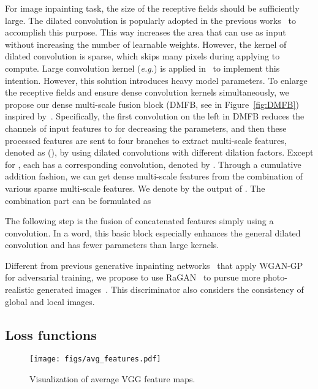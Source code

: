 \documentclass[journal]{IEEEtran}
\newcommand{\eg}{\emph{e.g.}}
\begin{document}
For image inpainting task, the size of the receptive fields should be sufficiently large. The dilated convolution is popularly adopted in the previous works~\cite{globally-and-locally,contextual-attention} to accomplish this purpose. This way increases the area that can use as input without increasing the number of learnable weights. However, the kernel of dilated convolution is sparse, which skips many pixels during applying to compute. Large convolution kernel (\eg ) is applied in~\cite{GMCNN} to implement this intention. However, this solution introduces heavy model parameters. To enlarge the receptive fields and ensure dense convolution kernels simultaneously, we propose our dense multi-scale fusion block (DMFB, see in Figure~\ref{fig:DMFB}) inspired by~\cite{Hui-PPON-2019}. Specifically, the first convolution on the left in DMFB reduces the channels of input features to  for decreasing the parameters, and then these processed features are sent to four branches to extract multi-scale features, denoted as  (), by using dilated convolutions with different dilation factors. Except for , each  has a corresponding  convolution, denoted by . Through a cumulative addition fashion, we can get dense multi-scale features from the combination of various sparse multi-scale features. We denote by  the output of . The combination part can be formulated as

The following step is the fusion of concatenated features simply using a  convolution. In a word, this basic block especially enhances the general dilated convolution and has fewer parameters than large kernels.

Different from previous generative inpainting networks~\cite{contextual-attention,GMCNN} that apply WGAN-GP~\cite{WGAN-GP} for adversarial training, we propose to use RaGAN~\cite{RaGAN} to pursue more photo-realistic generated images~\cite{ESRGAN}. This discriminator also considers the consistency of global and local images.

\subsection{Loss functions}

\begin{figure}[htpb]
	\centering
	\texttt{[image: figs/avg\_features.pdf]}
	\caption{Visualization of average VGG feature maps.}
	\label{fig:avg-features}
\end{figure}
\end{document}
